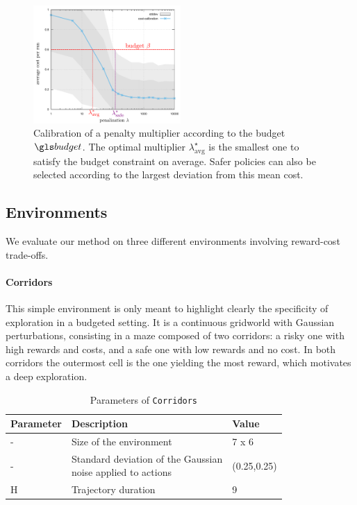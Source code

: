 \begin{figure}[tp]
	\centering
	\includegraphics[width=0.5\textwidth]{img/CalibrationExample}
	\caption{Calibration of a penalty multiplier according to the budget $\budget$. The optimal multiplier $\lambda^{\star}_{\text{avg}}$ is the smallest one to satisfy the budget constraint on average. Safer policies can also be selected according to the largest deviation from this mean cost.}
	\label{fig:Lagrangian}
\end{figure}


\subsection{Environments}
\label{subsec:environments}
We evaluate our method on three different environments involving reward-cost trade-offs.

\paragraph{Corridors}
This simple environment is only meant to highlight clearly the specificity of exploration in a budgeted setting. It is a continuous gridworld with Gaussian perturbations, consisting in a maze composed of two corridors: a risky one with high rewards and costs, and a safe one with low rewards and no cost. In both corridors the outermost cell is the one yielding the most reward, which motivates a deep exploration.

\begin{table}[ht!]
    \centering
    \begin{tabular}{lll}
        \toprule
        Parameter & Description & Value\tabularnewline
        \midrule
        - & Size of the environment & 7 x 6\tabularnewline
        - & \makecell[l]{Standard deviation of the Gaussian \\noise applied to actions} & (0.25,0.25)\tabularnewline
        H & Trajectory duration & 9\tabularnewline
        \bottomrule
    \end{tabular}
    \caption{Parameters of \texttt{Corridors}}
    \label{tab:param-corridors}
\end{table}

